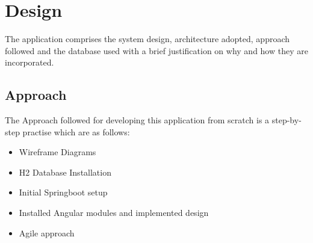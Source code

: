 \chapter{Design}
The application comprises the system design, architecture adopted, approach followed and the database used with a brief justification on why and how they are incorporated. 

\section{Approach}
The Approach followed for developing this application from scratch is a step-by-step practise which are as follows:
    \begin{itemize}
        \item Wireframe Diagrams
        \item H2 Database Installation 
        \item Initial Springboot setup
        \item Installed Angular modules and implemented design               
        \item Agile approach
    \end{itemize}
    
    
    
